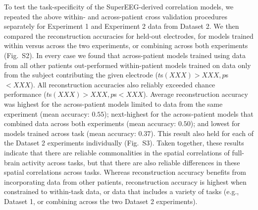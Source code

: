 \message{ !name(main.tex)}\documentclass[11pt]{article}
\newcommand{\perexptaskrecon}{S2}
\newcommand{\perexptaskreconseparated}{S3}
\begin{document}
{To test the task-specificity of the SuperEEG-derived correlation
models, we repeated the above within- and across-patient cross validation
procedures separately for Experiment 1 and Experiment 2 data from
Dataset 2.  We then compared the reconstruction accuracies for held-out
electrodes, for models trained within versus across the two
experiments, or combining across both experiments
(Fig.~\perexptaskrecon).  In every case we found that across-patient
models trained using data from all other patients out-performed
within-patient models trained on data only from the subject
contributing the given electrode ($t$s$(XXX) > XXX, p$s$ < XXX$).  All
reconstruction accuracies also reliably exceeded chance performance
($t$s$(XXX) > XXX, p$s$ < XXX$).  Average reconstruction accuracy was
highest for the across-patient models limited to data from the same
experiment (mean accuracy: $0.55$); next-highest for the
across-patient models that combined data across both experiments (mean
accuracy: $0.50$); and lowest for models trained across task (mean
accuracy: $0.37$).  This result also held for each of the Dataset 2
experiments individually (Fig.~\perexptaskreconseparated).  Taken
together, these results indicate that there are reliable commonalities
in the spatial correlations of full-brain activity across tasks, but
that there are also reliable differences in these spatial correlations
across tasks.  Whereas reconstruction accuracy benefits from
incorporating data from other patients, reconstruction accuracy is
highest when constrained to within-task data, or data that includes a
variety of tasks (e.g., Dataset 1, or combining across the two Dataset
2 experiments).

}
\end{document}
